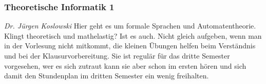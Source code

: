 
\subsubsection{Theoretische Informatik 1}
	\textit{Dr. Jürgen Koslowski}
	Hier geht es um formale Sprachen und Automatentheorie. Klingt theoretisch und mathelastig? Ist es auch. Nicht gleich aufgeben, wenn man in der Vorlesung nicht mitkommt, die kleinen Übungen helfen beim Verständnis und bei der Klausurvorbereitung. Sie ist regulär für das dritte Semester vorgesehen, wer es sich zutraut kann sie aber schon im ersten hören und sich damit den Stundenplan im dritten Semester ein wenig freihalten. 